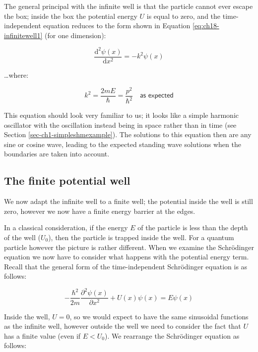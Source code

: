 \documentclass[
]{book}
\begin{document}
The general principal with the infinite well is that the particle cannot ever escape the box; inside the box the potential energy \(U\) is equal to zero, and the time-independent equation reduces to the form shown in Equation \eqref{eq:ch18-infinitewell1} (for one dimension):

\begin{equation}
\frac{\mathrm{d}^2 \psi(x)}{\mathrm{d}x^2} = -k^2 \psi(x)
\label{eq:ch18-infinitewell1}
\end{equation}

\ldots where:

\begin{equation}
k^2 = \frac{2mE}{\hbar} = \frac{p^2}{\hbar^2} \quad \textsf{as expected}
\end{equation}

This equation should look very familiar to us; it looks like a simple harmonic oscillator with the oscillation instead being in space rather than in time (see Section \ref{sec-ch1-simpleshmexample}). The solutions to this equation then are any sine or cosine wave, leading to the expected standing wave solutions when the boundaries are taken into account.

\hypertarget{the-finite-potential-well}{%
\subsection{The finite potential well}\label{the-finite-potential-well}}

We now adapt the infinite well to a finite well; the potential inside the well is still zero, however we now have a finite energy barrier at the edges.

In a classical consideration, if the energy \(E\) of the particle is less than the depth of the well (\(U_0\)), then the particle is trapped inside the well. For a quantum particle however the picture is rather different. When we examine the Schrödinger equation we now have to consider what happens with the potential energy term. Recall that the general form of the time-independent Schrödinger equation is as follows:

\begin{equation}
-\frac{\hbar^2}{2m} \frac{\partial^2 \psi(x)}{\partial x^2} + U(x) \psi(x) =  E \psi(x)
\end{equation}

Inside the well, \(U = 0\), so we would expect to have the same sinusoidal functions as the infinite well, however outside the well we need to consider the fact that \(U\) has a finite value (even if \(E<U_0\)). We rearrange the Schrödinger equation as follows:
\end{document}
